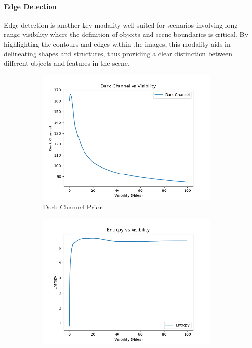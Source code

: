 \paragraph{Edge Detection}
Edge detection is another key modality well-suited for scenarios involving long-range visibility where the definition of objects and scene boundaries is critical. By highlighting the contours and edges within the images, this modality aids in delineating shapes and structures, thus providing a clear distinction between different objects and features in the scene.

\begin{figure}[htbp]
    \centering
    \begin{subfigure}[b]{0.24\textwidth}
        \includegraphics[width=\textwidth]{imgs/dark_channel_vs_visibility.png}
        \caption{Dark Channel Prior}
        \label{fig:mean_dark_channel}
    \end{subfigure}
    \hfill
    \begin{subfigure}[b]{0.24\textwidth}
        \includegraphics[width=\textwidth]{imgs/entropy_vs_visibility.png}

\end{subfigure}
\end{figure}
